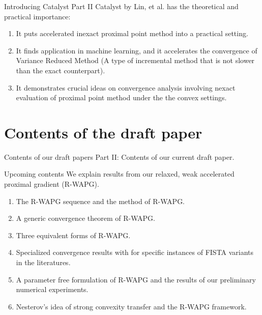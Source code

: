 \documentclass[11pt]{beamer}
\theoremstyle{definition}
\begin{document}
        \begin{frame}{Introducing Catalyst Part II}
            Catalyst by Lin, et al. \cite{lin_catalyst_2018, lin_universal_2015} has the theoretical and practical importance: 
            \begin{enumerate}
                \item It puts accelerated inexact proximal point method into a practical setting. 
                \item It finds application in machine learning, and it accelerates the convergence of Variance Reduced Method (A type of incremental method that is not slower than the exact counterpart). 
                \item It demonstrates crucial ideas on convergence analysis involving nexact evaluation of proximal point method under the the convex settings. 
            \end{enumerate}
        \end{frame}

\section{Contents of the draft paper}
    \begin{frame}{Contents of our draft papers}
        Part II: Contents of our current draft paper. 
        \begin{block}{Upcoming contents}
            We explain results from our relaxed, weak accelerated proximal gradient (R-WAPG). 
            \begin{enumerate}
                \item The R-WAPG sequence and the method of R-WAPG. 
                \item A generic convergence theorem of R-WAPG. 
                \item Three equivalent forms of R-WAPG. 
                \item Specialized convergence results with for specific instances of FISTA variants in the literatures. 
                \item A parameter free formulation of R-WAPG and the results of our preliminary numerical experiments. 
                \item Nesterov's idea of strong convexity transfer and the R-WAPG framework. 
            \end{enumerate}
        \end{block}
        
    \end{frame}
\end{document}
